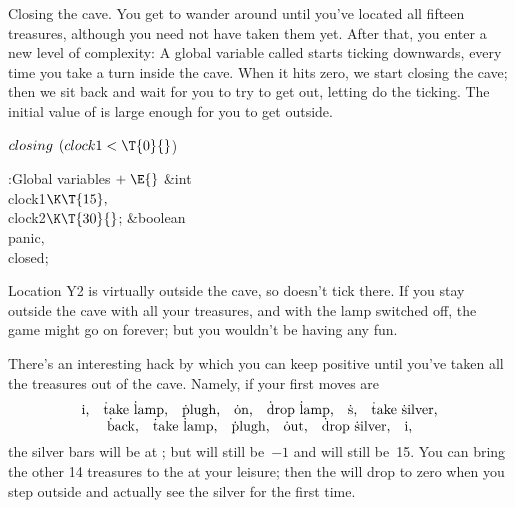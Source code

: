 Closing the cave. You get to wander around until you've located all
fifteen treasures, although you need not have taken them yet. After that,
you enter a new level of complexity: A global variable called
 starts ticking downwards, every time you take a turn inside the
cave.
When it hits zero, we start closing the cave; then we sit back and
wait for you to try to get out, letting  do the ticking.
The initial value of  is large enough for you to get outside.

\Y\B\4\D$\\{closing}$ \5
$(\\{clock1}<\T{0}{}$)\par
\Y\B\4:Global variables\X${}\mathrel+\E{}$\6
\&{int} \\{clock1}${}\K\T{15},{}$ \\{clock2}${}\K\T{30}{}$;\6
\&{boolean} \\{panic}${},{}$ \\{closed};\par
\fi

Location Y2 is virtually outside the cave, so  doesn't
tick there.
If you stay outside the cave with all your treasures, and with the lamp
switched off, the game might go on forever; but you wouldn't be having
any fun.

There's an interesting hack by which you can keep  positive
until you've taken all the treasures out of the cave. Namely, if your
first moves are
$$\vcenter{\halign{\hfil\hbox{#}\hfil\cr
\.{in},\quad \.{take} \.{lamp},\quad \.{plugh},\quad \.{on},\quad \.{drop} %
\.{lamp},\quad \.s,\quad
\.{take} \.{silver},\cr
\.{back},\quad \.{take} \.{lamp},\quad \.{plugh},\quad \.{out},\quad
\.{drop} \.{silver},\quad \.{in},\cr}}$$
the silver bars will be at ; but  will
still be~$-1$
and  will still be~15. You can bring the other 14 treasures to
the
 at your leisure; then the  will drop to zero when
you step
outside and actually see the silver for the first time.

